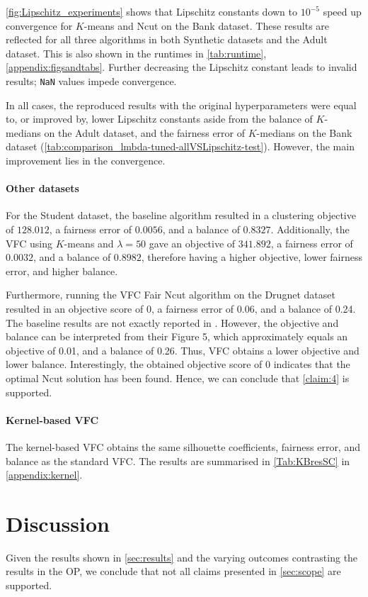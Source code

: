 \autoref{fig:Lipschitz_experiments} shows that Lipschitz constants down to $10^{-5}$ speed up convergence for $K$-means and Ncut on the Bank dataset. These results are reflected for all three algorithms in both Synthetic datasets and the Adult dataset. This is also shown in the runtimes in \autoref{tab:runtime}, \autoref{appendix:figsandtabs}. Further decreasing the Lipschitz constant leads to invalid results; \verb+NaN+ values impede convergence. 

In all cases, the reproduced results with the original hyperparameters were equal to, or improved by, lower Lipschitz constants aside from the balance of $K$-medians on the Adult dataset, and the fairness error of $K$-medians on the Bank dataset (\autoref{tab:comparison_lmbda-tuned-allVSLipschitz-test}). However, the main improvement lies in the convergence.

\paragraph{Other datasets}
For the Student dataset, the baseline algorithm resulted in a clustering objective of $128.012$, a fairness error of $0.0056$, and a balance of $0.8327$. Additionally, the VFC using $K$-means and $\lambda = 50$ gave an objective of $341.892$, a fairness error of $0.0032$, and a balance of $0.8982$, therefore having a higher objective, lower fairness error, and higher balance.

Furthermore, running the VFC Fair Ncut algorithm on the Drugnet dataset resulted in an objective score of 0, a fairness error of 0.06, and a balance of 0.24. The baseline results are not exactly reported in \citep{kleindessner2019guarantees}. However, the objective and balance can be interpreted from their Figure 5, which approximately equals an objective of 0.01, and a balance of 0.26. Thus, VFC obtains a lower objective and lower balance. Interestingly, the obtained objective score of 0 indicates that the optimal Ncut solution has been found. Hence, we can conclude that \ref{claim:4} is supported.

\paragraph{Kernel-based VFC}
The kernel-based VFC obtains the same silhouette coefficients, fairness error, and balance as the standard VFC. The results are summarised in \autoref{Tab:KBresSC} in \autoref{appendix:kernel}.

\section{Discussion}
Given the results shown in \autoref{sec:results} and the varying outcomes contrasting the results in the OP, we conclude that not all claims presented in \autoref{sec:scope} are supported. 
